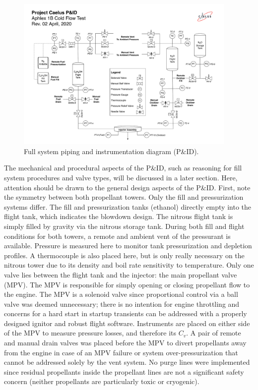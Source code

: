 \documentclass[9pt]{article} %
\numberwithin{equation}{section} %
\begin{document}
\begin{figure}[!htb]
    \centering
    \includegraphics[scale=0.5, width=0.95\textwidth, trim={0.5cm 0cm 0.5cm 3.9cm}, clip]{Aphlex1B_04-02-2020_P&ID.pdf} %
    \caption{Full system piping and instrumentation diagram (P\&ID).}
    \label{fig:pid_1}
\end{figure}

The mechanical and procedural aspects of the P\&ID, such as reasoning for fill system procedures and valve types, will be discussed in a later section. Here, attention should be drawn to the general design aspects of the P\&ID. First, note the symmetry between both propellant towers. Only the fill and pressurization systems differ. The fill and pressurization tanks (ethanol) directly empty into the flight tank, which indicates the blowdown design. The nitrous flight tank is simply filled by gravity via the nitrous storage tank. During both fill and flight conditions for both towers, a remote and ambient vent of the pressurant is available. Pressure is measured here to monitor tank pressurization and depletion profiles. A thermocouple is also placed here, but is only really necessary on the nitrous tower due to its density and boil rate sensitivity to temperature. Only one valve lies between the flight tank and the injector: the main propellant valve (MPV). The MPV is responsible for simply opening or closing propellant flow to the engine. The MPV is a solenoid valve since proportional control via a ball valve was deemed unnecessary; there is no intention for engine throttling and concerns for a hard start in startup transients can be addressed with a properly designed ignitor and robust flight software. Instruments are placed on either side of the MPV to measure pressure losses, and therefore its $C_{v}$. A pair of remote and manual drain valves was placed before the MPV to divert propellants away from the engine in case of an MPV failure or system over-pressurization that cannot be addressed solely by the vent system. No purge lines were implemented since residual propellants inside the propellant lines are not a significant safety concern (neither propellants are particularly toxic or cryogenic).
\end{document}
